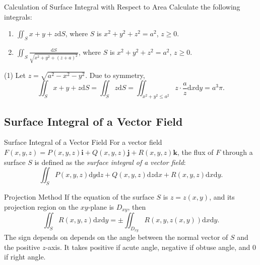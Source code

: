 \begin{example}{Calculation of Surface Integral with Respect to Area}{}
  Calculate the following integrals:
  \begin{enumerate}
  \item $\iint_S x + y + z \mathrm{d} S$, where $S$ is $x^2 + y^2 + z^2 = a^2$,
    $z \geq 0$.
  \item $\iint_S \frac{\mathrm{d} S}{\sqrt{x^2 + y^2 + (z+a)^2}}$, where $S$ is
    $x^2 + y^2 + z^2 = a^2$, $z \geq 0$.
  \end{enumerate}
\end{example}

\begin{solution}
  (1) Let $z = \sqrt{a^2 - x^2 - y^2}$. Due to symmetry, 
  \begin{equation}
    \iint_S x+y+z\mathrm{d}S
    = \iint_S z \mathrm{d} S
    = \iint_{x^2 + y^2 \leq a^2} z \cdot \frac{a}{z} \mathrm{d} x \mathrm{d}y
    = a^3\pi.
  \end{equation}
\end{solution}



\subsection{Surface Integral of a Vector Field}

\begin{definition}{Surface Integral of a Vector Field}{}
  For a vector field $F(x,y,z) = P(x,y,z)\mathbf{i} + Q(x,y,z)\mathbf{j} + R(x,y,z)\mathbf{k}$,
  the flux of $F$ through a surface $S$ is defined as the
  \emph{surface integral of a vector field}:
  \begin{equation}
    \iint_S P(x,y,z)\mathrm{d}y\mathrm{d}z + Q(x,y,z)\mathrm{d}z\mathrm{d}x + R(x,y,z)\mathrm{d} x\mathrm{d}y.
  \end{equation}
\end{definition}

\begin{proposition}{Projection Method}{}
  If the equation of the surface $S$ is $z = z(x,y)$, and its projection region
  on the $xy$-plane is $D_{xy}$, then
  \begin{equation}
    \iint_S R(x,y,z)\mathrm{d}x\mathrm{d}y = \pm \iint_{D_{xy}} R(x,y,z(x,y))\mathrm{d}x\mathrm{d}y.
  \end{equation}
  The sign depends on depends on the angle between the normal vector of $S$ and
  the positive $z$-axis. It takes positive if acute angle,
  negative if obtuse angle, and $0$ if right angle.
\end{proposition}

